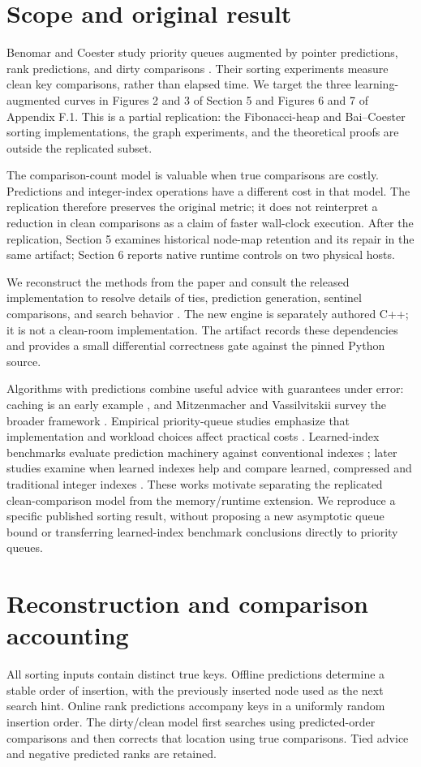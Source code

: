 \section{Scope and original result}
Benomar and Coester study priority queues augmented by pointer predictions, rank predictions, and dirty comparisons \cite{ref1}. Their sorting experiments measure clean key comparisons, rather than elapsed time. We target the three learning-augmented curves in Figures 2 and 3 of Section 5 and Figures 6 and 7 of Appendix F.1. This is a partial replication: the Fibonacci-heap and Bai–Coester sorting implementations, the graph experiments, and the theoretical proofs are outside the replicated subset.

The comparison-count model is valuable when true comparisons are costly. Predictions and integer-index operations have a different cost in that model. The replication therefore preserves the original metric; it does not reinterpret a reduction in clean comparisons as a claim of faster wall-clock execution. After the replication, Section 5 examines historical node-map retention and its repair in the same artifact; Section 6 reports native runtime controls on two physical hosts.

We reconstruct the methods from the paper and consult the released implementation to resolve details of ties, prediction generation, sentinel comparisons, and search behavior \cite{ref1,ref2}. The new engine is separately authored C++; it is not a clean-room implementation. The artifact records these dependencies and provides a small differential correctness gate against the pinned Python source.

Algorithms with predictions combine useful advice with guarantees under error: caching is an early example \cite{ref10}, and Mitzenmacher and Vassilvitskii survey the broader framework \cite{ref11}. Empirical priority-queue studies emphasize that implementation and workload choices affect practical costs \cite{ref3,ref6}. Learned-index benchmarks evaluate prediction machinery against conventional indexes \cite{ref7}; later studies examine when learned indexes help and compare learned, compressed and traditional integer indexes \cite{ref8,ref9}. These works motivate separating the replicated clean-comparison model from the memory/runtime extension. We reproduce a specific published sorting result, without proposing a new asymptotic queue bound or transferring learned-index benchmark conclusions directly to priority queues.

\section{Reconstruction and comparison accounting}
All sorting inputs contain distinct true keys. Offline predictions determine a stable order of insertion, with the previously inserted node used as the next search hint. Online rank predictions accompany keys in a uniformly random insertion order. The dirty/clean model first searches using predicted-order comparisons and then corrects that location using true comparisons. Tied advice and negative predicted ranks are retained.

